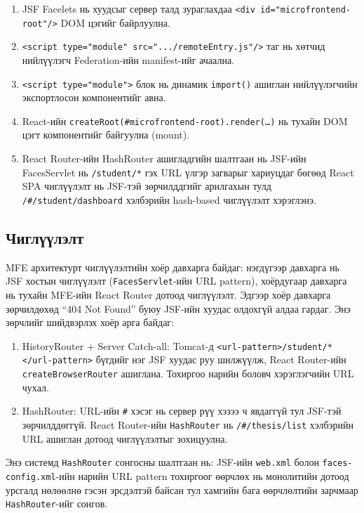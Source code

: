 \begin{enumerate}
  \item JSF Facelets нь хуудсыг сервер талд зураглахдаа
    \texttt{<div id="microfrontend-root"/>} DOM цэгийг байрлуулна.
  \item \texttt{<script type="module" src=".../remoteEntry.js"/>} таг
    нь хөтчид нийлүүлэгч Federation-ийн manifest-ийг ачаална.
  \item \texttt{<script type="module">} блок нь динамик \texttt{import()}
    ашиглан нийлүүлэгчийн экспортлосон компонентийг авна.
  \item React-ийн \texttt{createRoot(\#microfrontend-root).render(\ldots)}
    нь тухайн DOM цэгт компонентийг байгуулна (mount).
  \item React Router-ийн HashRouter ашигладгийн шалтгаан нь
    JSF-ийн FacesServlet нь \texttt{/student/*} гэх URL үлгэр загварыг
    хариуцдаг бөгөөд React SPA чиглүүлэлт нь JSF-тэй зөрчилддгийг
    арилгахын тулд \texttt{/\#/student/dashboard} хэлбэрийн hash-based
    чиглүүлэлт хэрэглэнэ.
\end{enumerate}

\subsection{Чиглүүлэлт}

MFE архитектурт чиглүүлэлтийн хоёр давхарга байдаг: нэгдүгээр давхарга
нь JSF хостын чиглүүлэлт (\texttt{FacesServlet}-ийн URL pattern), хоёрдугаар
давхарга нь тухайн MFE-ийн React Router дотоод чиглүүлэлт. Эдгээр хоёр
давхарга зөрчилдөхөд ``404 Not Found'' буюу JSF-ийн хуудас олдохгүй
алдаа гардаг. Энэ зөрчлийг шийдвэрлэх хоёр арга байдаг:

\begin{enumerate}
  \item HistoryRouter + Server Catch-all: Tomcat-д
    \texttt{<url-pattern>/student/*</url-pattern>} бүгдийг нэг JSF
    хуудас руу шилжүүлж, React Router-ийн \texttt{createBrowserRouter}
    ашиглана. Тохиргоо нарийн боловч хэрэглэгчийн URL чухал.
  \item HashRouter: URL-ийн \texttt{\#} хэсэг нь сервер рүү
    хэзээ ч явдаггүй тул JSF-тэй зөрчилддөггүй. React Router-ийн
    \texttt{HashRouter} нь \texttt{/\#/thesis/list} хэлбэрийн URL
    ашиглан дотоод чиглүүлэлтыг зохицуулна.
\end{enumerate}

Энэ системд \texttt{HashRouter} сонгосны шалтгаан нь: JSF-ийн \texttt{web.xml}
болон \texttt{faces-config.xml}-ийн нарийн URL pattern тохиргоог өөрчлөх
нь монолитийн дотоод урсгалд нөлөөлнө гэсэн эрсдэлтэй байсан тул
хамгийн бага өөрчлөлтийн зарчмаар \texttt{HashRouter}-ийг сонгов.

